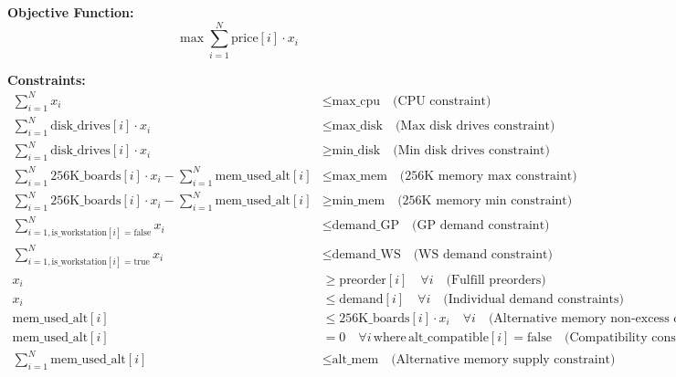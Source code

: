 \documentclass{article}
\begin{document}
\textbf{Objective Function:}
\begin{equation}
    \max \sum_{i=1}^{N} \text{price}[i] \cdot x_i
\end{equation}

\textbf{Constraints:}
\begin{align}
    \sum_{i=1}^{N} x_i & \leq \text{max\_cpu} \quad \text{(CPU constraint)} \\
    \sum_{i=1}^{N} \text{disk\_drives}[i] \cdot x_i & \leq \text{max\_disk} \quad \text{(Max disk drives constraint)} \\
    \sum_{i=1}^{N} \text{disk\_drives}[i] \cdot x_i & \geq \text{min\_disk} \quad \text{(Min disk drives constraint)} \\
    \sum_{i=1}^{N} \text{256K\_boards}[i] \cdot x_i - \sum_{i=1}^{N} \text{mem\_used\_alt}[i] & \leq \text{max\_mem} \quad \text{(256K memory max constraint)} \\
    \sum_{i=1}^{N} \text{256K\_boards}[i] \cdot x_i - \sum_{i=1}^{N} \text{mem\_used\_alt}[i] & \geq \text{min\_mem} \quad \text{(256K memory min constraint)} \\
    \sum_{i=1, \text{is\_workstation}[i] = \text{false}}^{N} x_i & \leq \text{demand\_GP} \quad \text{(GP demand constraint)} \\
    \sum_{i=1, \text{is\_workstation}[i] = \text{true}}^{N} x_i & \leq \text{demand\_WS} \quad \text{(WS demand constraint)} \\
    x_i & \geq \text{preorder}[i] \quad \forall i \quad \text{(Fulfill preorders)} \\
    x_i & \leq \text{demand}[i] \quad \forall i \quad \text{(Individual demand constraints)} \\
    \text{mem\_used\_alt}[i] & \leq \text{256K\_boards}[i] \cdot x_i \quad \forall i \quad \text{(Alternative memory non-excess constraint)} \\
    \text{mem\_used\_alt}[i] & = 0 \quad \forall i \, \text{where} \, \text{alt\_compatible}[i] = \text{false} \quad \text{(Compatibility constraint)} \\
    \sum_{i=1}^{N} \text{mem\_used\_alt}[i] & \leq \text{alt\_mem} \quad \text{(Alternative memory supply constraint)}
\end{align}
\end{document}
